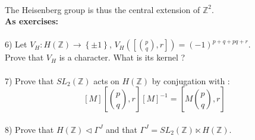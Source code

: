 \documentclass[10pt,a4paper]{article}
\begin{document}
\\
The Heisenberg group is thus the central extension of $\mathbb{Z}^2$.\\
\textbf{As exercises:}\\
\\
6) Let $V_H:H(\mathbb{Z})\rightarrow\left\{\pm1\right\}$, $V_H\left(\left[\binom{p}{q},r\right]\right)=(-1)^{p+q+pq+r}$.\\
Prove that $V_H$ is a character. What is its kernel ?\\
\\
7) Prove that $SL_2(\mathbb{Z})$ acts on $H(\mathbb{Z})$ by conjugation with :
\[[M]\left[\binom{p}{q},r\right][M]^{-1}=\left[M\binom{p}{q},r\right]\]
\\
8) Prove that $H(\mathbb{Z})\triangleleft\Gamma^J$ and that $\Gamma	^J = SL_2(\mathbb{Z})\ltimes H(\mathbb{Z})$.
\end{document}
